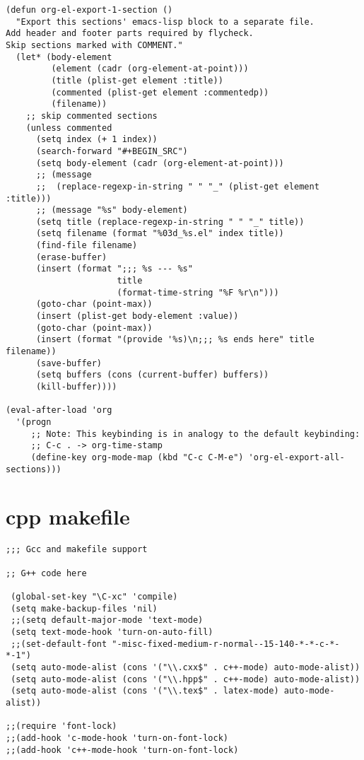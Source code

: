 \documentclass[11pt]{article}
\begin{document}
\begin{verbatim}
(defun org-el-export-1-section ()
  "Export this sections' emacs-lisp block to a separate file.
Add header and footer parts required by flycheck.
Skip sections marked with COMMENT."
  (let* (body-element
         (element (cadr (org-element-at-point)))
         (title (plist-get element :title))
         (commented (plist-get element :commentedp))
         (filename))
    ;; skip commented sections
    (unless commented
      (setq index (+ 1 index))
      (search-forward "#+BEGIN_SRC")
      (setq body-element (cadr (org-element-at-point)))
      ;; (message
      ;;  (replace-regexp-in-string " " "_" (plist-get element :title)))
      ;; (message "%s" body-element)
      (setq title (replace-regexp-in-string " " "_" title))
      (setq filename (format "%03d_%s.el" index title))
      (find-file filename)
      (erase-buffer)
      (insert (format ";;; %s --- %s"
                      title
                      (format-time-string "%F %r\n")))
      (goto-char (point-max))
      (insert (plist-get body-element :value))
      (goto-char (point-max))
      (insert (format "(provide '%s)\n;;; %s ends here" title filename))
      (save-buffer)
      (setq buffers (cons (current-buffer) buffers))
      (kill-buffer))))

(eval-after-load 'org
  '(progn
     ;; Note: This keybinding is in analogy to the default keybinding:
     ;; C-c . -> org-time-stamp
     (define-key org-mode-map (kbd "C-c C-M-e") 'org-el-export-all-sections)))
\end{verbatim}

\section{cpp makefile}
\label{sec:org99a3e05}

\begin{verbatim}
;;; Gcc and makefile support

;; G++ code here

 (global-set-key "\C-xc" 'compile)
 (setq make-backup-files 'nil)
 ;;(setq default-major-mode 'text-mode)
 (setq text-mode-hook 'turn-on-auto-fill)
 ;;(set-default-font "-misc-fixed-medium-r-normal--15-140-*-*-c-*-*-1")
 (setq auto-mode-alist (cons '("\\.cxx$" . c++-mode) auto-mode-alist))
 (setq auto-mode-alist (cons '("\\.hpp$" . c++-mode) auto-mode-alist))
 (setq auto-mode-alist (cons '("\\.tex$" . latex-mode) auto-mode-alist))

;;(require 'font-lock)
;;(add-hook 'c-mode-hook 'turn-on-font-lock)
;;(add-hook 'c++-mode-hook 'turn-on-font-lock)

\end{verbatim}
\end{document}
